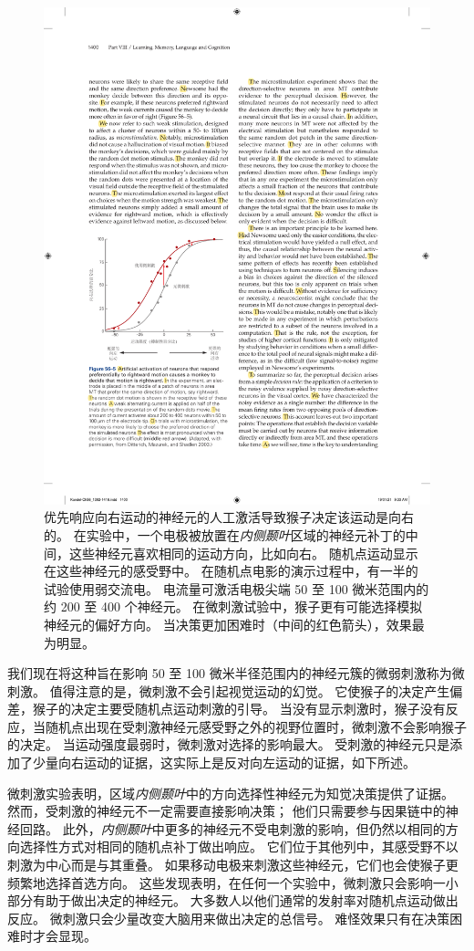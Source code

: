 \begin{figure}[htbp]
	\centering
	\includegraphics[width=0.65\linewidth]{chap56/fig_56_5}
	\caption{优先响应向右运动的神经元的人工激活导致猴子决定该运动是向右的。
		在实验中，一个电极被放置在\textit{内侧颞叶}区域的神经元补丁的中间，这些神经元喜欢相同的运动方向，比如向右。
		随机点运动显示在这些神经元的感受野中。
		在随机点电影的演示过程中，有一半的试验使用弱交流电。
		电流量可激活电极尖端 50 至 100 微米范围内的约 200 至 400 个神经元。
		在微刺激试验中，猴子更有可能选择模拟神经元的偏好方向。
		当决策更加困难时（中间的红色箭头），效果最为明显\cite{ditterich2003microstimulation}。}
	\label{fig:56_5}
\end{figure}


我们现在将这种旨在影响 50 至 100 微米半径范围内的神经元簇的微弱刺激称为微刺激。
值得注意的是，微刺激不会引起视觉运动的幻觉。
它使猴子的决定产生偏差，猴子的决定主要受随机点运动刺激的引导。
当没有显示刺激时，猴子没有反应，当随机点出现在受刺激神经元感受野之外的视野位置时，微刺激不会影响猴子的决定。
当运动强度最弱时，微刺激对选择的影响最大。
受刺激的神经元只是添加了少量向右运动的证据，这实际上是反对向左运动的证据，如下所述。


微刺激实验表明，区域\textit{内侧颞叶}中的方向选择性神经元为知觉决策提供了证据。
然而，受刺激的神经元不一定需要直接影响决策；
他们只需要参与因果链中的神经回路。
此外，\textit{内侧颞叶}中更多的神经元不受电刺激的影响，但仍然以相同的方向选择性方式对相同的随机点补丁做出响应。
它们位于其他列中，其感受野不以刺激为中心而是与其重叠。
如果移动电极来刺激这些神经元，它们也会使猴子更频繁地选择首选方向。
这些发现表明，在任何一个实验中，微刺激只会影响一小部分有助于做出决定的神经元。
大多数人以他们通常的发射率对随机点运动做出反应。
微刺激只会少量改变大脑用来做出决定的总信号。
难怪效果只有在决策困难时才会显现。


